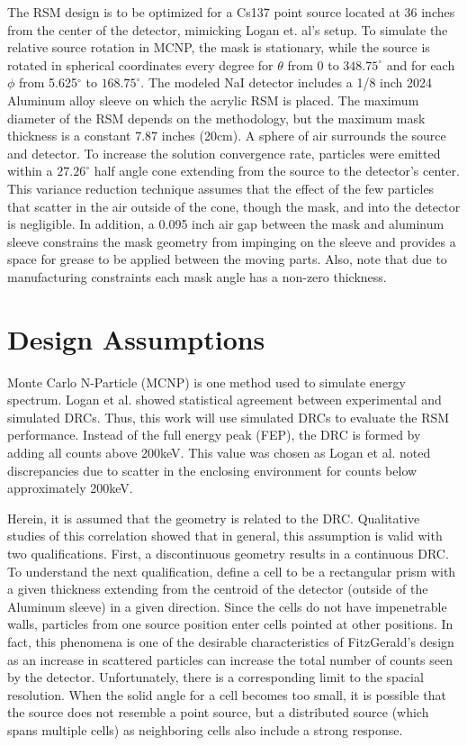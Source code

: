 \documentclass[3p,times]{elsarticle}
\begin{document}
The RSM design is to be optimized for a Cs137 point source located at 36 inches from the center of the detector, mimicking Logan et. al's setup.  
To simulate the relative source rotation in MCNP, the mask is stationary, while the source is rotated in spherical coordinates every degree for $\theta$ from 0 
to $348.75^\circ$ and for each $\phi$ from 5.625$^\circ$ to $168.75^\circ$.  
The modeled NaI detector includes a 1/8 inch 2024 Aluminum alloy sleeve on which the acrylic RSM is placed.  The maximum diameter of the RSM depends on the methodology, but the maximum mask thickness 
is a constant 7.87 inches (20cm).  A sphere of air surrounds the source and detector.  To increase the solution convergence rate, particles were emitted within 
a $27.26^\circ$ half angle cone extending from the source to the detector's center.  This variance reduction technique assumes that the effect of the few particles that 
scatter in the air outside of the cone, though the mask, and into the detector is negligible.  In addition, a 0.095 inch air gap between the mask and 
aluminum sleeve constrains the mask geometry from impinging on the sleeve and provides a space for grease to be applied between the moving parts.
Also, note that due to manufacturing constraints each mask angle has a non-zero thickness.

\section{Design Assumptions}
Monte Carlo N-Particle (MCNP) is one method used to simulate energy spectrum.  Logan et al.\cite{Logan2017} showed statistical agreement between experimental and simulated DRCs.  
Thus, this work will use simulated DRCs to evaluate the RSM performance.  Instead of the full energy peak (FEP), the DRC is formed by adding all counts above 200keV.  
This value was chosen as Logan et al. noted discrepancies due
to scatter in the enclosing environment for counts below approximately 200keV.

Herein, it is assumed that the geometry is related to the DRC.  Qualitative studies of this correlation showed that in general, this 
assumption is valid with two qualifications.  First, a discontinuous geometry results in a continuous DRC.  To understand the next qualification, 
define a cell to be a rectangular prism with a given thickness extending from
the centroid of the detector (outside of the Aluminum sleeve) in a given direction.
Since the cells do not have impenetrable walls, particles from one source position
enter cells pointed at other positions.  In fact, this phenomena is one of the desirable characteristics of FitzGerald's design as an increase in scattered particles can increase
the total number of counts seen by the detector.  Unfortunately, there is a corresponding limit to the spacial resolution.  
When the solid angle for a cell becomes too small, it is possible that the source does not 
resemble a point source, but a distributed source (which spans multiple cells) as neighboring cells also include a strong response.
\end{document}
